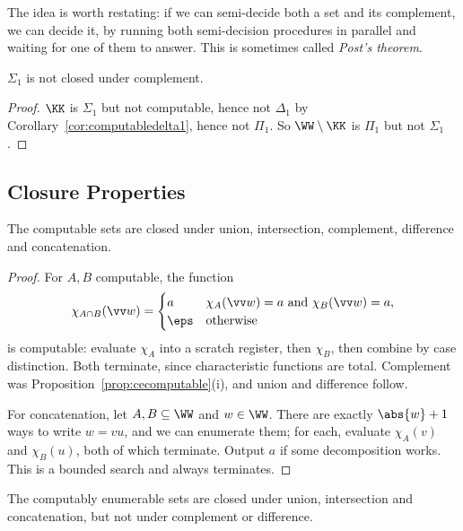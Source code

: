 The idea is worth restating: if we can semi-decide both a set and its complement, we can decide it, by running both semi-decision procedures in parallel and waiting for one of them to answer. This is sometimes called \emph{Post's theorem}.

\begin{corollary}\label{cor:sigmanotcomplement}
	$\Sigma_1$ is not closed under complement.
\end{corollary}

\begin{proof}
	$\KK$ is $\Sigma_1$ but not computable, hence not $\Delta_1$ by Corollary~\ref{cor:computabledelta1}, hence not $\Pi_1$. So $\WW\setminus\KK$ is $\Pi_1$ but not $\Sigma_1$.
\end{proof}

\subsection{Closure Properties}

\begin{proposition}
	The computable sets are closed under union, intersection, complement, difference and concatenation.
\end{proposition}

\begin{proof}
	For $A, B$ computable, the function
	$$\chi_{A\cap B}(\vv w) = \begin{cases} a & \chi_A(\vv w) = a \text{ and } \chi_B(\vv w) = a, \\ \eps & \text{otherwise}\end{cases}$$
	is computable: evaluate $\chi_A$ into a scratch register, then $\chi_B$, then combine by case distinction. Both terminate, since characteristic functions are total. Complement was Proposition~\ref{prop:cecomputable}(i), and union and difference follow.

	For concatenation, let $A, B \subseteq \WW$ and $w \in \WW$. There are exactly $\abs{w}+1$ ways to write $w = vu$, and we can enumerate them; for each, evaluate $\chi_A(v)$ and $\chi_B(u)$, both of which terminate. Output $a$ if some decomposition works. This is a bounded search and always terminates.
\end{proof}

\begin{proposition}\label{prop:ceclosure}
	The computably enumerable sets are closed under union, intersection and concatenation, but not under complement or difference.
\end{proposition}

